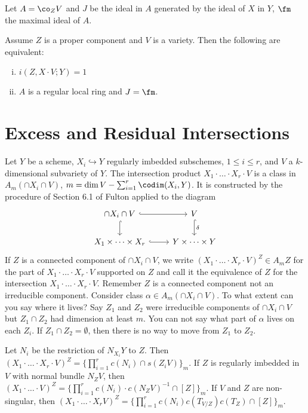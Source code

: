 Let $A=\co_Z V$ and $J$ be the ideal in $A$ generated by the ideal of $X$ in $Y$, $\fm$ the maximal ideal of $A$.

\begin{prop}
Assume $Z$ is a proper component and $V$ is a variety. Then the following are equivalent:
\begin{enumerate}[(i)]
\item $i(Z, X\cdot V;Y)=1$
\item $A$ is a regular local ring and $J=\fm$. 
\end{enumerate}
\end{prop}


\section{Excess and Residual Intersections}

Let $Y$ be a scheme, $X_i \hookrightarrow Y$ regularly imbedded subschemes, $1 \leq i \leq r$, and $V$ a $k$-dimensional subvariety of $Y$. The intersection product $X_1 \cdot \ldots \cdot X_r \cdot V$ is a class in $A_m(\cap X_i \cap V)$, $m=\dim V - \sum_{i=1}^r \codim(X_i,Y)$. It is constructed by the procedure of Section 6.1 of Fulton applied to the diagram
	\[
	\begin{tikzcd}
	\cap X_i \cap V \arrow[hook]{d} \arrow[hook]{r} & V \arrow[hook]{d}{\delta} \\
	X_1 \times \cdots \times X_r \arrow[hook]{r} & Y \times \cdots \times Y
	\end{tikzcd}
	\]
If $Z$ is a connected component of $\cap X_i \cap V$, we write $(X_1 \cdot \ldots \cdot X_r \cdot V)^Z \in A_mZ$ for the part of $X_1 \cdot \ldots \cdot X_r \cdot V$ supported on $Z$ and call it the equivalence of $Z$ for the intersection $X_1 \cdot \ldots \cdot X_r \cdot V$. Remember $Z$ is a connected component not an irreducible component. Consider class $\alpha \in A_m(\cap X_i \cap V)$. To what extent can you say where it lives? Say $Z_1$ and $Z_2$ were irreducible components of $\cap X_i \cap V$ but $Z_1 \cap Z_2$ had dimension at least $m$. You can not say what part of $\alpha$ lives on each $Z_i$. If $Z_1 \cap Z_2=\emptyset$, then there is no way to move from $Z_1$ to $Z_2$.

\begin{prop}
Let $N_i$ be the restriction of $N_{X_i}Y$ to $Z$. Then $(X_1 \cdot \ldots \cdot X_r \cdot V)^Z=\{\prod_{i=1}^r c(N_i) \cap s(Z_iV)\}_m$. If $Z$ is regularly imbedded in $V$ with normal bundle $N_Z V$, then $(X_1 \cdot \ldots \cdot V)^Z=\{\prod_{i=1}^r c(N_i) \cdot c(N_ZV)^{-1} \cap [Z]\}_m$. If $V$ and $Z$ are non-singular, then $(X_1 \cdot \ldots \cdot X_r V)^Z=\{\prod_{i=1}^r c(N_i) c(T_{V/Z} )c(T_Z) \cap [Z] \}_m$.
\end{prop}

